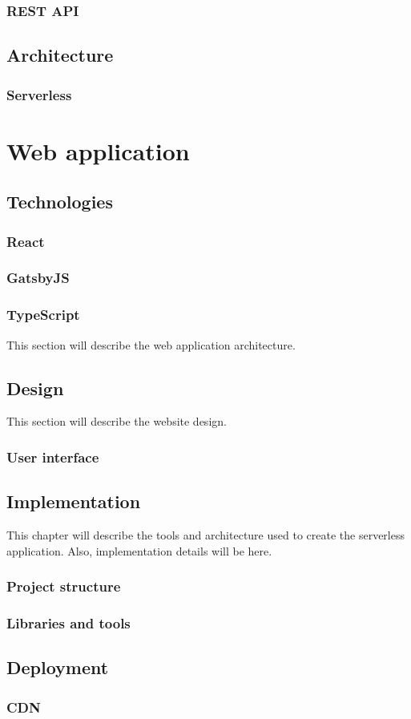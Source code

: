 \documentclass[12pt,oneside]{fithesis2}
\begin{document}
    \subsection{REST API}
    \section{Architecture}
    \subsection{Serverless}
    \chapter{Web application}
    \section{Technologies}
    \subsection{React}
    \subsection{GatsbyJS}
    \subsection{TypeScript}
    This section will describe the web application architecture.
    \section{Design}
    This section will describe the website design.
    \subsection{User interface}
    \section{Implementation}
    This chapter will describe the tools and architecture used to create the serverless application. Also, implementation details will be here.
    \subsection{Project structure}
    \subsection{Libraries and tools}
    \section{Deployment}
    \subsection{CDN}
\end{document}
